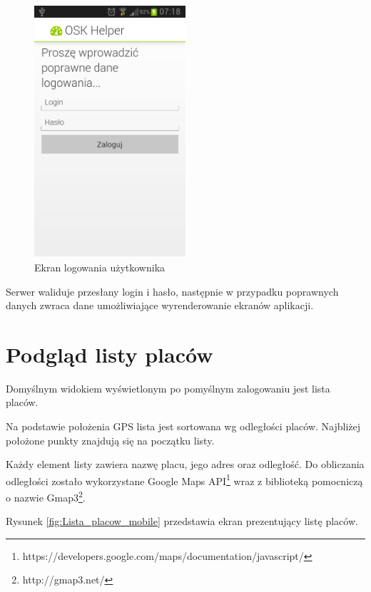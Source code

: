 \documentclass[twoside,a4paper,openright,12pt]{book}
\begin{document}
\begin{figure}[H]
\centering
\includegraphics[width=0.5\textwidth]{screenshots/android/logowanie.png}
\caption{Ekran logowania użytkownika}
\label{fig:Logowanie_mobile}
\end{figure}

Serwer waliduje przesłany login i hasło, następnie w przypadku poprawnych danych zwraca dane umożliwiające wyrenderowanie ekranów aplikacji.


\section{Podgląd listy placów}
Domyślnym widokiem wyświetlonym po pomyślnym zalogowaniu jest lista placów.

Na podstawie położenia GPS lista jest sortowana wg odległości placów. Najbliżej położone punkty znajdują się na początku listy.

Każdy element listy zawiera nazwę placu, jego adres oraz odległość. Do obliczania odległości zostało wykorzystane Google Maps API\footnote{https://developers.google.com/maps/documentation/javascript/} wraz z biblioteką pomocniczą o nazwie Gmap3\footnote{http://gmap3.net/}.

Rysunek \ref{fig:Lista_placow_mobile} przedstawia ekran prezentujący listę placów.
\end{document}
